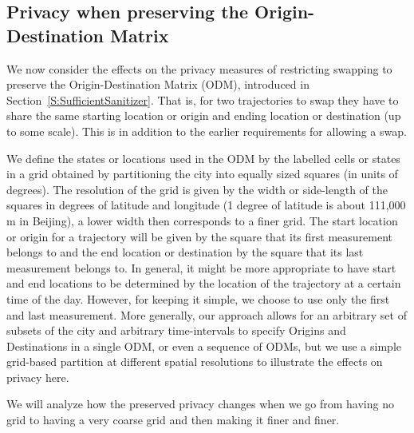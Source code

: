 \subsection{Privacy when preserving the Origin-Destination Matrix}\label{S:PrivacyODM}
We now consider the effects on the privacy measures of restricting 
swapping to preserve the Origin-Destination Matrix (ODM), introduced in Section~\ref{S:SufficientSanitizer}. That is, for two trajectories to
swap they have to share the same starting location or origin and ending location or destination (up to some scale).  
This is in addition to the earlier requirements for allowing a swap.

We define the states or locations used in the ODM by the labelled cells or states in a grid obtained by partitioning the
city into equally sized squares (in units of degrees).  
The resolution of the grid is given by the width or side-length of the squares in degrees of latitude and
longitude (1 degree of latitude is about 111,000 m in Beijing), a lower width then corresponds to a finer grid. 
The start location or origin for a trajectory will be given by the square that its first
measurement belongs to and the end location or destination by the square that its last
measurement belongs to. In general, it might be more appropriate to
have start and end locations to be determined by the location of the
trajectory at a certain time of the day. However, for keeping it
simple, we choose to use only the first and last measurement.
More generally, our approach allows for an arbitrary set of subsets of the city and arbitrary time-intervals to specify Origins and Destinations in a single ODM, or even a sequence of ODMs, but we use a simple grid-based partition at different spatial resolutions to illustrate the effects on privacy here.  

We will analyze how the preserved privacy changes when we go from having
no grid to having a very coarse grid and then making it finer and
finer.

